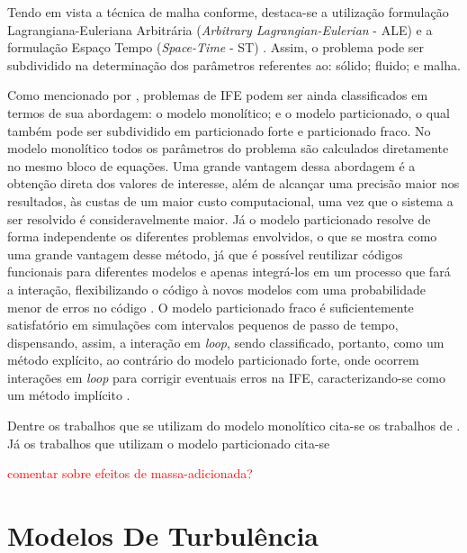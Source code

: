 \documentclass[_ArquivoPrincipal.tex]{subfiles}
\begin{document}
Tendo em vista a técnica de malha conforme, destaca-se a utilização formulação Lagrangiana-Euleriana Arbitrária (\textit{Arbitrary Lagrangian-Eulerian} - ALE) \cite{donea1982arbitrary,kanchi20073d,fernandes2019ale} e a formulação Espaço Tempo (\textit{Space-Time} - ST) \cite{takizawa2011multiscale,terahara2020heart,takizawa2011stabilized}. Assim, o problema pode ser subdividido na determinação dos parâmetros referentes ao: sólido; fluido; e malha.

Como mencionado por , problemas de IFE podem ser ainda classificados em termos de sua abordagem: o modelo monolítico; e o modelo particionado, o qual também pode ser subdividido em particionado forte e particionado fraco. No modelo monolítico todos os parâmetros do problema são calculados diretamente no mesmo bloco de equações. Uma grande vantagem dessa abordagem é a obtenção direta dos valores de interesse, além de alcançar uma precisão maior nos resultados, às custas de um maior custo computacional, uma vez que o sistema a ser resolvido é consideravelmente maior. Já o modelo particionado resolve de forma independente os diferentes problemas envolvidos, o que se mostra como uma grande vantagem desse método, já que é possível reutilizar códigos funcionais para diferentes modelos e apenas integrá-los em um processo que fará a interação, flexibilizando o código à novos modelos com uma probabilidade menor de erros no código \cite{roux2008domain,hou2012numerical}. O modelo particionado fraco é suficientemente satisfatório em simulações com intervalos pequenos de passo de tempo, dispensando, assim, a interação em \textit{loop}, sendo classificado, portanto, como um método explícito, ao contrário do modelo particionado forte, onde ocorrem interações em \textit{loop} para corrigir eventuais erros na IFE, caracterizando-se como um método implícito \cite{fernandes2020tecnica}.

Dentre os trabalhos que se utilizam do modelo monolítico cita-se os trabalhos de . Já os trabalhos que utilizam o modelo particionado cita-se 

\textcolor{red}{comentar sobre efeitos de massa-adicionada?}

\section{Modelos De Turbulência} \label{MT}
\end{document}
